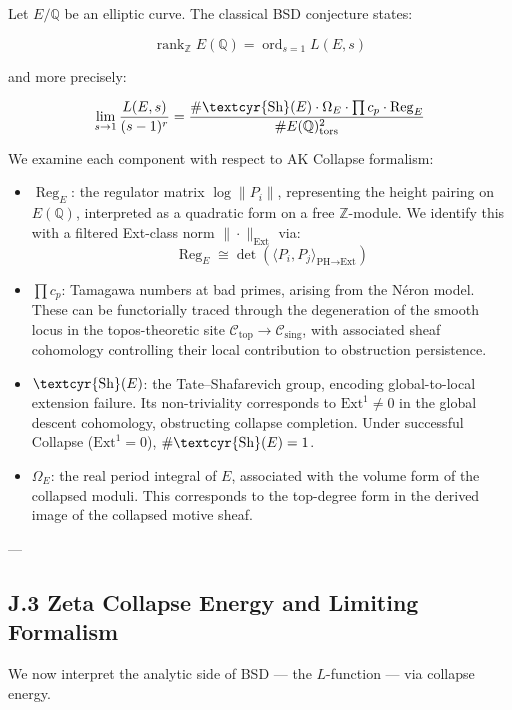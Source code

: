 \documentclass[11pt]{article}
\newcommand{\Sha}{\text{\textcyr{Sh}}}
\begin{document}
Let $E/\mathbb{Q}$ be an elliptic curve. The classical BSD conjecture states:

\[
\operatorname{rank}_{\mathbb{Z}} E(\mathbb{Q}) = \operatorname{ord}_{s=1} L(E,s)
\]

and more precisely:

\[
\lim_{s \to 1} \frac{L(E,s)}{(s-1)^r} = \frac{\#\Sha(E)\cdot \Omega_E \cdot \prod c_p \cdot \operatorname{Reg}_E}{\# E(\mathbb{Q})_\text{tors}^2}
\]

We examine each component with respect to AK Collapse formalism:

\begin{itemize}
  \item $\operatorname{Reg}_E$: the regulator matrix $\log \|P_i\|$, representing the height pairing on $E(\mathbb{Q})$, interpreted as a quadratic form on a free $\mathbb{Z}$-module. We identify this with a filtered Ext-class norm $\|\cdot\|_{\text{Ext}}$ via:
  \[
  \operatorname{Reg}_E \cong \det\left( \langle P_i, P_j \rangle_{\text{PH} \to \text{Ext}} \right)
  \]
  
  \item $\prod c_p$: Tamagawa numbers at bad primes, arising from the Néron model. These can be functorially traced through the degeneration of the smooth locus in the topos-theoretic site $\mathcal{C}_{\text{top}} \to \mathcal{C}_{\text{sing}}$, with associated sheaf cohomology controlling their local contribution to obstruction persistence.

  \item $\Sha(E)$: the Tate–Shafarevich group, encoding global-to-local extension failure. Its non-triviality corresponds to $\mathrm{Ext}^1 \neq 0$ in the global descent cohomology, obstructing collapse completion. Under successful Collapse ($\mathrm{Ext}^1 = 0$), $\#\Sha(E) = 1$.

  \item $\Omega_E$: the real period integral of $E$, associated with the volume form of the collapsed moduli. This corresponds to the top-degree form in the derived image of the collapsed motive sheaf.
\end{itemize}

---

\subsection*{J.3 Zeta Collapse Energy and Limiting Formalism}

We now interpret the analytic side of BSD — the $L$-function — via collapse energy.
\end{document}
